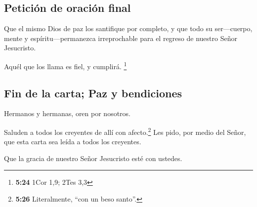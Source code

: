 \hypertarget{peticiuxf3n-de-oraciuxf3n-final}{%
\subsection{Petición de oración
final}\label{peticiuxf3n-de-oraciuxf3n-final}}

 Que el mismo Dios de paz los santifique por completo, y
que todo su ser---cuerpo, mente y espíritu---permanezca irreprochable
para el regreso de nuestro Señor Jesucristo.

 Aquél que los llama es fiel, y cumplirá. \footnote{\textbf{5:24}
  1Cor 1,9; 2Tes 3,3}

\hypertarget{fin-de-la-carta-paz-y-bendiciones}{%
\subsection{Fin de la carta; Paz y
bendiciones}\label{fin-de-la-carta-paz-y-bendiciones}}

 Hermanos y hermanas, oren por nosotros.

 Saluden a todos los creyentes de allí con
afecto.\footnote{\textbf{5:26} Literalmente, ``con un beso santo''.}
 Les pido, por medio del Señor, que esta carta sea leída
a todos los creyentes.

 Que la gracia de nuestro Señor Jesucristo esté con
ustedes.
